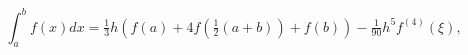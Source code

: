 \[\int_{a}^{b}f(x)dx=\tfrac{1}{3}h(f(a)+4f(\tfrac{1}{2}(a+b))+f(b))-\tfrac{1}{90%
}h^{5}f^{(4)}(\xi),\]